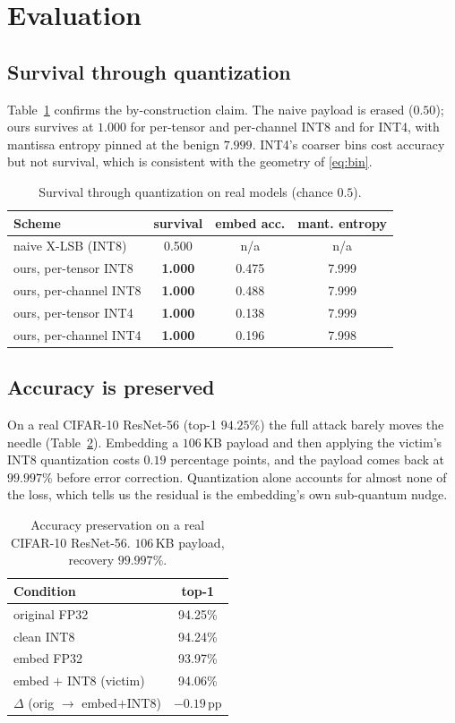 \documentclass[a4paper,fleqn]{cas-dc}
\theoremstyle{plain}
\theoremstyle{remark}
\begin{document}
\section{Evaluation}\label{sec:eval}
\subsection{Survival through quantization}
Table~\ref{tab:survive} confirms the by-construction claim. The naive payload is erased
($0.50$); ours survives at $1.000$ for per-tensor and per-channel INT8 and for INT4,
with mantissa entropy pinned at the benign $7.999$. INT4's coarser bins cost accuracy
but not survival, which is consistent with the geometry of \eqref{eq:bin}.

\begin{table}[t]\centering
\caption{Survival through quantization on real models (chance $0.5$).}
\label{tab:survive}
\begin{tabular*}{\columnwidth}{@{\extracolsep{\fill}}lccc@{}}
\toprule
Scheme & survival & embed acc. & mant. entropy\\
\midrule
naive X-LSB (INT8) & 0.500 & n/a & n/a\\
ours, per-tensor INT8 & \textbf{1.000} & 0.475 & 7.999\\
ours, per-channel INT8 & \textbf{1.000} & 0.488 & 7.999\\
ours, per-tensor INT4 & \textbf{1.000} & 0.138 & 7.999\\
ours, per-channel INT4 & \textbf{1.000} & 0.196 & 7.998\\
\bottomrule
\end{tabular*}
\end{table}

\subsection{Accuracy is preserved}
On a real CIFAR-10 ResNet-56 (top-1 $94.25\%$) the full attack barely moves the needle
(Table~\ref{tab:acc}). Embedding a $106$\,KB payload and then applying the victim's
INT8 quantization costs $0.19$ percentage points, and the payload comes back at
$99.997\%$ before error correction. Quantization alone accounts for almost none of the
loss, which tells us the residual is the embedding's own sub-quantum nudge.

\begin{table}[t]\centering
\caption{Accuracy preservation on a real CIFAR-10 ResNet-56. $106$\,KB payload, recovery $99.997\%$.}
\label{tab:acc}
\begin{tabular*}{\columnwidth}{@{\extracolsep{\fill}}lc@{}}
\toprule
Condition & top-1\\
\midrule
original FP32 & 94.25\%\\
clean INT8 & 94.24\%\\
embed FP32 & 93.97\%\\
embed $+$ INT8 (victim) & 94.06\%\\
\midrule
$\Delta$ (orig $\to$ embed$+$INT8) & $-0.19$\,pp\\
\bottomrule
\end{tabular*}
\end{table}
\end{document}
